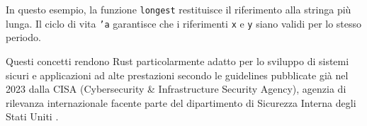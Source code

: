 In questo esempio, la funzione \texttt{longest} restituisce il riferimento alla stringa più lunga. Il ciclo di vita \texttt{'a} garantisce che i riferimenti \texttt{x} e \texttt{y} siano validi per lo stesso periodo.

Questi concetti rendono Rust particolarmente adatto per lo sviluppo di sistemi sicuri e applicazioni ad alte prestazioni secondo le guidelines pubblicate già nel 2023 dalla CISA (Cybersecurity \& Infrastructure Security Agency), agenzia di rilevanza internazionale facente parte del dipartimento di Sicurezza Interna degli Stati Uniti \cite{CISA}.
